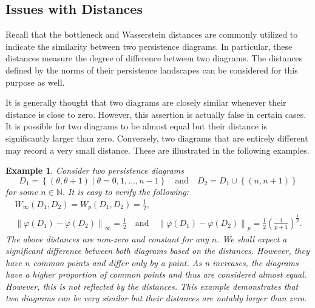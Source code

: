 \documentclass[sn-mathphys-num]{sn-jnl}%
\theoremstyle{thmstyleone}%
\theoremstyle{thmstyletwo}%
\newtheorem{example}{Example}%
\theoremstyle{thmstylethree}%
\begin{document}
\subsection{Issues with Distances}
Recall that the bottleneck and Wasserstein distances are commonly utilized to indicate the similarity between two persistence diagrams. In particular, these distances measure the degree of difference between two diagrams. The distances defined by the norms of their persistence landscapes can be considered for this purpose as well.

It is generally thought that two diagrams are closely similar whenever their distance is close to zero. However, this assertion is actually false in certain cases. It is possible for two diagrams to be almost equal but their distance is significantly larger than zero. Conversely, two diagrams that are entirely different may record a very small distance. These are illustrated in the following examples.

\begin{example}\label{example: distance not accurate 1}
	Consider two persistence diagrams
	\begin{equation*}
		D_1=\left\{(\theta, \theta+1) \mid \theta=0,1, \ldots, n-1\right\} \quad \textrm{and} \quad D_2=D_1 \cup\left\{(n, n+1)\right\}
	\end{equation*}
	for some $n \in \mathbb{N}$. It is easy to verify the following:
	\begin{gather*}
		W_{\infty}(D_1, D_2)=W_p(D_1, D_2)=\frac{1}{2}, \\
		\left\|\varphi(D_1)-\varphi(D_2)\right\|_{\infty}=\frac{1}{2} \quad \textrm{and} \quad\left\|\varphi(D_1)-\varphi(D_2)\right\|_p=\frac{1}{2}\left(\frac{1}{p+1}\right)^{\frac{1}{p}}.
	\end{gather*}
	The above distances are non-zero and constant for any $n$. We shall expect a significant difference between both diagrams based on the distances. However, they have $n$ common points and differ only by a point. As n increases, the diagrams have a higher proportion of common points and thus are considered almost equal. However, this is not reflected by the distances. This example demonstrates that two diagrams can be very similar but their distances are notably larger than zero.
\end{example}
\end{document}
